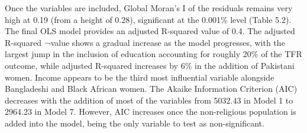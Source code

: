 \documentclass[12pt,twoside]{reedthesis}
\begin{document}
Once the variables are included, Global Moran's I of the residuals remains very high at 0.19 (from a height of 0.28), significant at the 0.001\% level (Table 5.2). The final OLS model provides an adjusted R-squared value of 0.4. The adjusted R-squared ¬value shows a gradual increase as the model progresses, with the largest jump in the inclusion of education accounting for roughly 20\% of the TFR outcome, while adjusted R-squared increases by 6\% in the addition of Pakistani women. Income appears to be the third most influential variable alongside Bangladeshi and Black African women. The Akaike Information Criterion (AIC) decreases with the addition of most of the variables from 5032.43 in Model 1 to 2964.23 in Model 7. However, AIC increases once the non-religious population is added into the model, being the only variable to test as non-significant.
\end{document}
